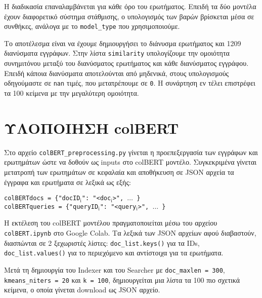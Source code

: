 ﻿\documentclass[12pt]{report}
\begin{document}
    Η διαδικασία επαναλαμβάνεται για κάθε όρο του ερωτήματος. Επειδή τα δύο μοντέλα έχουν διαφορετικό σύστημα στάθμισης, ο υπολογισμός των βαρών βρίσκεται μέσα σε συνθήκες, ανάλογα με το \verb|model_type| που χρησιμοποιούμε.

    Το αποτέλεσμα είναι να έχουμε δημιουργήσει το διάνυσμα ερωτήματος και 1209 διανύσματα εγγράφων. Στην λίστα \texttt{similarity} υπολογίζουμε
    την ομοιότητα συνημιτόνου μεταξύ του διανύσματος ερωτήματος και κάθε διανύσματος εγγράφου. Επειδή κάποια διανύσματα αποτελούνται από μηδενικά,
    στους υπολογισμούς οδηγούμαστε σε \texttt{nan} τιμές, που μετατρέπουμε σε \texttt{0}. Η συνάρτηση εν τέλει επιστρέφει τα 100 κείμενα με την μεγαλύτερη ομοιότητα.


    \section{ΥΛΟΠΟΙΗΣΗ colBERT}

    Στο αρχείο \verb|colBERT_preprocessing.py| γίνεται η προεπεξεργασία των εγγράφων και ερωτημάτων ώστε να δοθούν ως inputs στο colBERT μοντέλο.
    Συγκεκριμένα γίνεται μετατροπή των ερωτημάτων σε κεφαλαία και αποθήκευση σε JSON αρχεία τα έγγραφα και ερωτήματα σε λεξικά ως εξής:

    \begin{graycomment}
        \texttt{\small colBERTdocs = \{"docID\(_\text{i}\)": "<doc\(_\text{i}\)>", \(\ldots\) \} \\}
        \texttt{\small colBERTqueries = \{"queryID\(_\text{i}\)": "<query\(_\text{i}\)>", \(\ldots\) \}}
    \end{graycomment}

    Η εκτέλεση του colBERT μοντέλου πραγματοποιείται μέσω του αρχείου \texttt{colBERT.ipynb} στο Google Colab.
    Τα λεξικά των JSON αρχείων αφού διαβαστούν, διασπώνται σε 2 ξεχωριστές λίστες: \verb|doc_list.keys()| για τα IDs, \verb|doc_list.values()| για το περιεχόμενο και αντίστοιχα για τα ερωτήματα.

    Μετά τη δημιουργία του Indexer και του Searcher με \verb|doc_maxlen = 300|, \verb|kmeans_niters = 20| και \verb|k = 100|,
    δημιουργείται μια λίστα τα 100 πιο σχετικά κείμενα, ο οποία γίνεται download ως JSON αρχείο.
\end{document}
